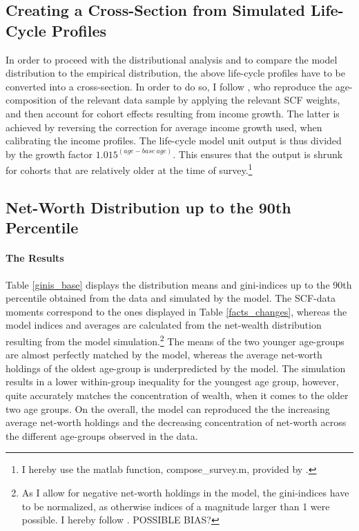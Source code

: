 \documentclass[a4paper,12pt,legno]{article}
\begin{document}
\subsection{Creating a Cross-Section from Simulated Life-Cycle Profiles}
In order to proceed with the distributional analysis and to compare the model distribution to the empirical distribution, the above life-cycle profiles have to be converted into a cross-section. In order to do so, I follow \cite{hintermaier2011}, who reproduce the age-composition of the relevant data sample by applying the relevant SCF weights, and then account for cohort effects resulting from income growth. The latter is achieved by reversing the correction for average income growth used, when calibrating the income profiles. The life-cycle model unit output is thus divided by the growth factor $1.015^{(age-base\ age)}$. This ensures that the output is shrunk for cohorts that are relatively older at the time of survey.\footnote{I hereby use the matlab function, compose\_survey.m, provided by \cite{hintermaier2016}.}

\subsection{Net-Worth Distribution up to the 90th Percentile}

\paragraph{The Results}
Table \ref{ginis_base} displays the distribution means and gini-indices up to the 90th percentile obtained from the data and simulated by the model. The SCF-data moments correspond to the ones displayed in Table \ref{facts_changes}, whereas the model indices and averages are calculated from the net-wealth distribution resulting from the model simulation.\footnote{As I allow for negative net-worth holdings in the model, the gini-indices have to be normalized, as otherwise indices of a magnitude larger than 1 were possible. I hereby follow \cite{chen1982}. POSSIBLE BIAS?} The means of the two younger age-groups are almost perfectly matched by the model, whereas the average net-worth holdings of the oldest age-group is underpredicted by the model. The simulation results in a lower within-group inequality for the youngest age group, however, quite accurately matches the concentration of wealth, when it comes to the older two age groups. On the overall, the model can reproduced the the increasing average net-worth holdings and the decreasing concentration of net-worth across the different age-groups observed in the data. 
\end{document}
